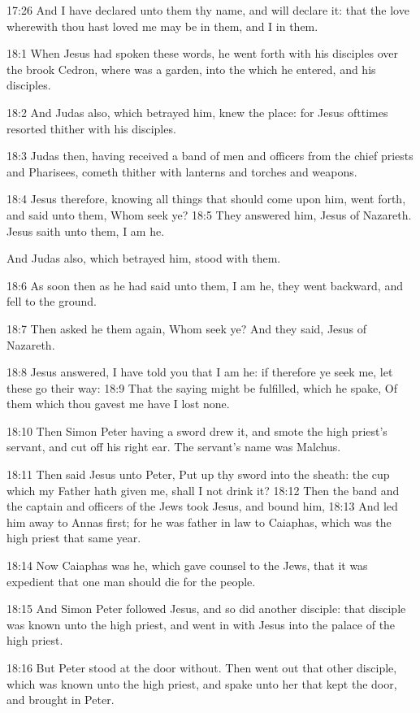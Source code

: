 17:26 And I have declared unto them thy name, and will declare it: that the love wherewith thou hast loved me may be in them, and I in them.

18:1 When Jesus had spoken these words, he went forth with his disciples over the brook Cedron, where was a garden, into the which he entered, and his disciples.

18:2 And Judas also, which betrayed him, knew the place: for Jesus ofttimes resorted thither with his disciples.

18:3 Judas then, having received a band of men and officers from the chief priests and Pharisees, cometh thither with lanterns and torches and weapons.

18:4 Jesus therefore, knowing all things that should come upon him, went forth, and said unto them, Whom seek ye?  18:5 They answered him, Jesus of Nazareth. Jesus saith unto them, I am he.

And Judas also, which betrayed him, stood with them.

18:6 As soon then as he had said unto them, I am he, they went backward, and fell to the ground.

18:7 Then asked he them again, Whom seek ye? And they said, Jesus of Nazareth.

18:8 Jesus answered, I have told you that I am he: if therefore ye seek me, let these go their way: 18:9 That the saying might be fulfilled, which he spake, Of them which thou gavest me have I lost none.

18:10 Then Simon Peter having a sword drew it, and smote the high priest's servant, and cut off his right ear. The servant's name was Malchus.

18:11 Then said Jesus unto Peter, Put up thy sword into the sheath: the cup which my Father hath given me, shall I not drink it?  18:12 Then the band and the captain and officers of the Jews took Jesus, and bound him, 18:13 And led him away to Annas first; for he was father in law to Caiaphas, which was the high priest that same year.

18:14 Now Caiaphas was he, which gave counsel to the Jews, that it was expedient that one man should die for the people.

18:15 And Simon Peter followed Jesus, and so did another disciple: that disciple was known unto the high priest, and went in with Jesus into the palace of the high priest.

18:16 But Peter stood at the door without. Then went out that other disciple, which was known unto the high priest, and spake unto her that kept the door, and brought in Peter.

